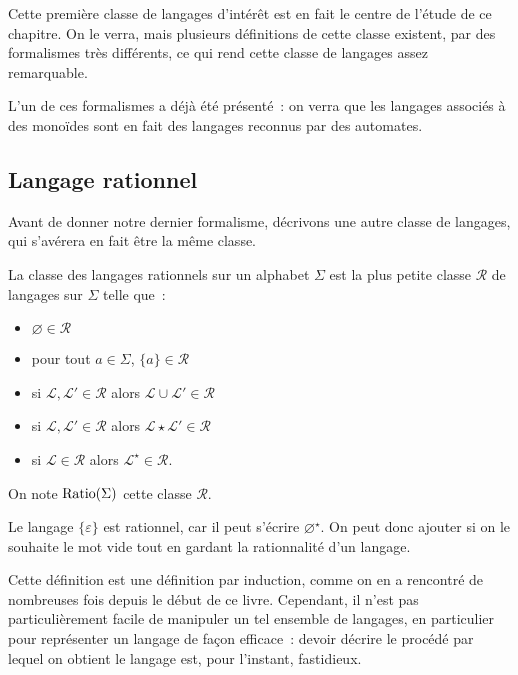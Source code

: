 Cette première classe de langages d'intérêt est en fait le centre de l'étude de
ce chapitre. On le verra, mais plusieurs définitions de cette classe existent,
par des formalismes très différents, ce qui rend cette classe de langages assez
remarquable.

L'un de ces formalismes a déjà été présenté~: on verra que les langages associés
à des monoïdes sont en fait des langages reconnus par des automates.

\subsection{Langage rationnel}

Avant de donner notre dernier formalisme, décrivons une autre classe de
langages, qui s'avérera en fait être la même classe.

\begin{definition}
  La classe des langages rationnels sur un alphabet $\Sigma$ est la plus petite
  classe $\mathcal R$ de langages sur $\Sigma$ telle que~:
  \begin{itemize}
  \item $\varnothing \in \mathcal R$
  \item pour tout $a \in \Sigma$, $\{a\}\in \mathcal R$
  \item si $\mathcal L,\mathcal L' \in \mathcal R$ alors
    $\mathcal L\cup \mathcal L' \in \mathcal R$
  \item si $\mathcal L,\mathcal L' \in \mathcal R$ alors
    $\mathcal L\star \mathcal L' \in \mathcal R$
  \item si $\mathcal L \in \mathcal R$ alors $\mathcal L^\star \in \mathcal R$.
  \end{itemize}

  On note $\operatorname{Ratio}(\Sigma)$ cette classe $\mathcal R$.
\end{definition}

\begin{remark}
  Le langage $\{\varepsilon\}$ est rationnel, car il peut s'écrire
  $\varnothing^\star$. On peut donc ajouter si on le souhaite le mot vide tout
  en gardant la rationnalité d'un langage.
\end{remark}

Cette définition est une définition par induction, comme on en a rencontré
de nombreuses fois depuis le début de ce livre. Cependant, il n'est pas
particulièrement facile de manipuler un tel ensemble de langages, en particulier
pour représenter un langage de façon efficace~: devoir décrire le procédé par
lequel on obtient le langage est, pour l'instant, fastidieux.

